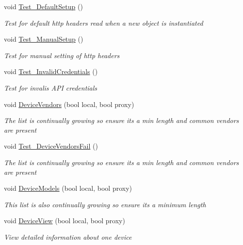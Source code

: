 \begin{DoxyCompactItemize}
void \hyperlink{class_h_d3_test_1_1_h_d3_test_a40db06e358aaea3612a1dcd1c2a7eb19}{Test\+\_\+\+Default\+Setup} ()
\begin{DoxyCompactList}\small\item\em Test for default http headers read when a new object is instantiated \end{DoxyCompactList}\item 
void \hyperlink{class_h_d3_test_1_1_h_d3_test_a89709fef570517d90e4944ac1f8c272b}{Test\+\_\+\+Manual\+Setup} ()
\begin{DoxyCompactList}\small\item\em Test for manual setting of http headers \end{DoxyCompactList}\item 
void \hyperlink{class_h_d3_test_1_1_h_d3_test_a08e66ab066b6ce947698625666c431dc}{Test\+\_\+\+Invalid\+Credentials} ()
\begin{DoxyCompactList}\small\item\em Test for invalis A\+P\+I credentials \end{DoxyCompactList}\item 
void \hyperlink{class_h_d3_test_1_1_h_d3_test_a3f7629accf687dfdfc7dcbe87239f0a9}{Device\+Vendors} (bool local, bool proxy)
\begin{DoxyCompactList}\small\item\em The list is continually growing so ensure its a min length and common vendors are present \end{DoxyCompactList}\item 
void \hyperlink{class_h_d3_test_1_1_h_d3_test_ab895f529cb41d975577528aeef648a85}{Test\+\_\+\+Device\+Vendors\+Fail} ()
\begin{DoxyCompactList}\small\item\em The list is continually growing so ensure its a min length and common vendors are present \end{DoxyCompactList}\item 
void \hyperlink{class_h_d3_test_1_1_h_d3_test_a135a5a91d8ea86bf6d9df940fd71117b}{Device\+Models} (bool local, bool proxy)
\begin{DoxyCompactList}\small\item\em This list is also continually growing so ensure its a minimum length \end{DoxyCompactList}\item 
void \hyperlink{class_h_d3_test_1_1_h_d3_test_a917ea12d2fbabb03670e1e3d1a05b238}{Device\+View} (bool local, bool proxy)
\begin{DoxyCompactList}\small\item\em View detailed information about one device \end{DoxyCompactList}\item 

\end{DoxyCompactItemize}
